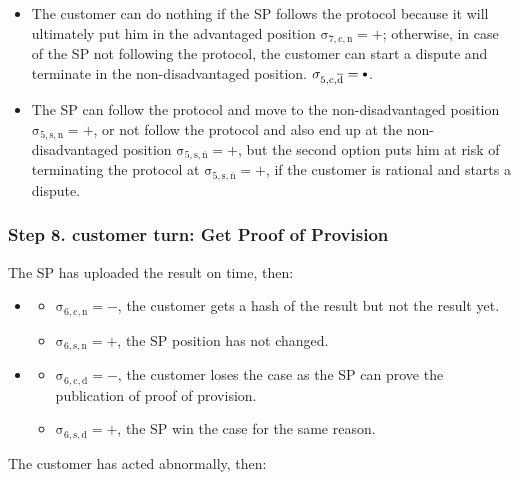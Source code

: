 \documentclass{ieeeaccess}
\newcommand\neutral[1][.75]{\mathbin{\ThisStyle{\vcenter{\hbox{%
  \scalebox{#1}{$\SavedStyle\bullet$}}}}}%
}
\begin{document}
\begin{itemize}
  \item The customer can do nothing if the SP follows the protocol because it will ultimately put him in the advantaged position \(\operatorname{\sigma_{7, c, n} = +}\); otherwise, in case of the SP not following the protocol, the customer can start a dispute and terminate in the non-disadvantaged position.  \(\operatorname{\sigma_{5, c, \overline{d}} = \neutral}\).
  \item The SP can follow the protocol and move to the non-disadvantaged position \(\operatorname{\sigma_{5, s, n} = +}\), or not follow the protocol and also end up at the non-disadvantaged position \(\operatorname{\sigma_{5, s, \overline{n}} = +}\), but the second option puts him at risk of terminating the protocol at \(\operatorname{\sigma_{5, s, \overline{n}} = +}\), if the customer is rational and starts a dispute.
\end{itemize}


\subsubsection{Step 8. customer turn: Get Proof of Provision}\label{step-8-pull-proof-of-provision}

The SP has uploaded the result on time, then:

\begin{itemize}
\item \AgreeablePath
  \begin{itemize}
    \item \(\operatorname{\sigma_{6, c, n} = -}\), the customer gets a hash of the result but not the result yet.
    \item \(\operatorname{\sigma_{6, s, n} = +}\), the SP position has not changed.
  \end{itemize}
\item \DisputePath

  \begin{itemize}
    \item \(\operatorname{\sigma_{6, c, d} = -}\), the customer loses the case as the SP can prove the publication of proof of provision. 
    \item \(\operatorname{\sigma_{6, s, d} = +}\), the SP win the case for the same reason.
  \end{itemize}
\end{itemize}

The customer has acted abnormally, then:
\end{document}
